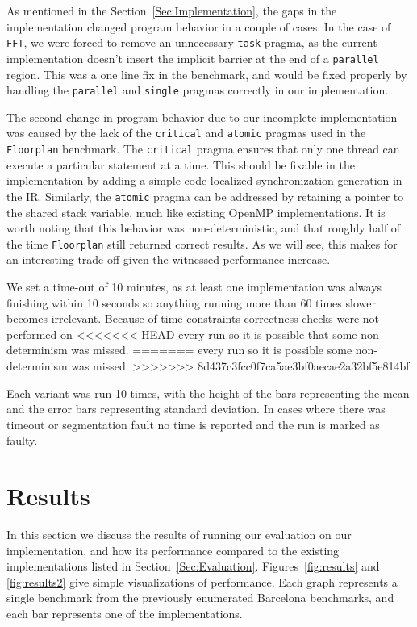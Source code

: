 \documentclass[sigconf]{acmart}
\begin{document}
As mentioned in the Section~\ref{Sec:Implementation}, the gaps in the implementation
changed program behavior in a couple of cases. In the case of \texttt{FFT}, we were
forced to remove an unnecessary \texttt{task} pragma, as the current implementation
doesn't insert the implicit barrier at the end of a \texttt{parallel} region. This
was a one line fix in the benchmark, and would be fixed properly by handling
the \texttt{parallel} and \texttt{single} pragmas correctly in our implementation.

The second change in program behavior due to our incomplete implementation was
caused by the lack of the \texttt{critical} and \texttt{atomic} pragmas used
in the \texttt{Floorplan} benchmark. The \texttt{critical} pragma
ensures that only one thread can execute a particular statement at a time.
This should be fixable in the implementation by adding a simple code-localized
synchronization generation in the IR\@. Similarly, the \texttt{atomic} pragma
can be addressed by retaining a pointer to the shared stack variable, much like
existing OpenMP implementations. It is worth noting that this behavior was
non-deterministic, and that roughly half of the time \texttt{Floorplan}
still returned correct results. As we will see, this makes for an interesting
trade-off given the witnessed performance increase.

We set a time-out of 10 minutes, as at least one implementation was always
finishing within 10 seconds so anything running more than 60 times slower becomes
irrelevant.  Because of time constraints correctness checks were not performed on
<<<<<<< HEAD
every run so it is possible that some non-determinism was missed. 
=======
every run so it is possible some non-determinism was missed.
>>>>>>> 8d437c3fcc0f7ca5ae3bf0aecae2a32bf5e814bf

Each variant was run 10 times, with the height of the bars representing the
mean and the error bars representing standard deviation. In cases where there
was timeout or segmentation fault no time is reported and the run is marked
as faulty.

\section{Results} \label{Sec:Results}

In this section we discuss the results of running our evaluation on our
implementation, and how its performance compared to the existing
implementations listed in Section~\ref{Sec:Evaluation}. 
Figures~\ref{fig:results} and \ref{fig:results2} give simple visualizations of
performance. Each graph represents a single benchmark from the previously
enumerated Barcelona benchmarks, and each bar represents one of the
implementations.
\end{document}
